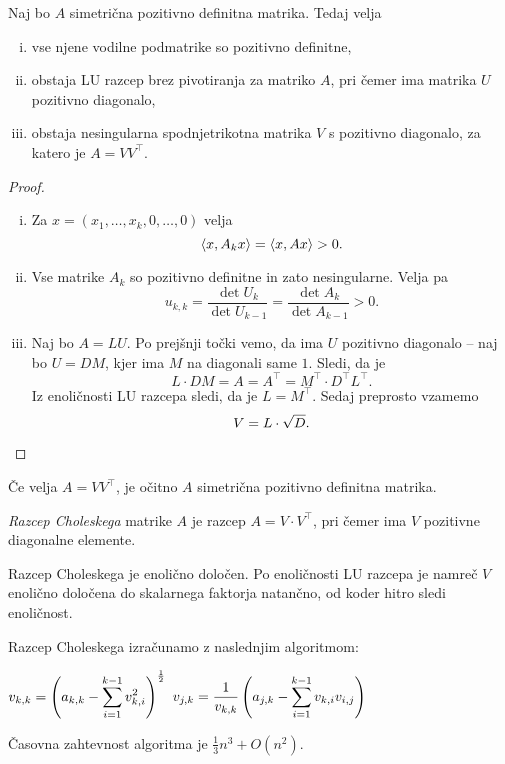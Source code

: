 \begin{izrek}
Naj bo $A$ simetrična pozitivno definitna matrika. Tedaj velja

\begin{enumerate}[i)]
\item vse njene vodilne podmatrike so pozitivno definitne,
\item obstaja LU razcep brez pivotiranja za matriko $A$, pri čemer
ima matrika $U$ pozitivno diagonalo,
\item obstaja nesingularna spodnjetrikotna matrika $V$ s pozitivno
diagonalo, za katero je $A = VV^\top$.
\end{enumerate}
\end{izrek}

\begin{proof}
\phantom{a}
\begin{enumerate}[i)]
\item Za $x = (x_1, \dots, x_k, 0, \dots, 0)$ velja
\[
\left\langle x, A_k x\right\rangle = \left\langle x, Ax\right\rangle > 0.
\]
\item Vse matrike $A_k$ so pozitivno definitne in zato
nesingularne. Velja pa
\[
u_{k,k} = \frac{\det U_k}{\det U_{k-1}} =
\frac{\det A_k}{\det A_{k-1}} > 0.
\]
\item Naj bo $A = LU$. Po prejšnji točki vemo, da ima $U$ pozitivno
diagonalo -- naj bo $U = DM$, kjer ima $M$ na diagonali same $1$.
Sledi, da je
\[
L \cdot DM = A = A^\top = M^\top \cdot D^\top L^\top.
\]
Iz enoličnosti LU razcepa sledi, da je $L = M^\top$. Sedaj
preprosto vzamemo
\[
V = L \cdot \sqrt{D}. \qedhere
\]
\end{enumerate}
\end{proof}

\begin{opomba}
Če velja $A = VV^\top$, je očitno $A$ simetrična pozitivno
definitna matrika.
\end{opomba}

\begin{definicija}
\emph{Razcep Choleskega} matrike
$A$ je razcep $A = V \cdot V^\top$, pri čemer ima $V$ pozitivne
diagonalne elemente.
\end{definicija}

\begin{opomba}
Razcep Choleskega je enolično določen. Po enoličnosti LU razcepa je
namreč $V$ enolično določena do skalarnega faktorja natančno, od
koder hitro sledi enoličnost.
\end{opomba}

\begin{opomba}
Razcep Choleskega izračunamo z naslednjim algoritmom:

\begin{algorithmic}[1]
  \State $\displaystyle v_{k,k} =
  \left(a_{k,k} - \sum_{i=1}^{k-1} v_{k,i}^2\right)^{\frac{1}{2}}$
    \State $\displaystyle v_{j,k} = \frac{1}{v_{k,k}}
    \left(a_{j,k} - \sum_{i=1}^{k-1} v_{k,i} v_{i,j}\right)$
  \EndFor
\EndFor
\end{algorithmic}

Časovna zahtevnost algoritma je $\frac{1}{3} n^3 + O(n^2)$.
\end{opomba}

